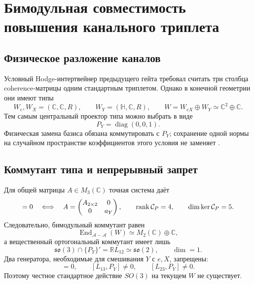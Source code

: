 \chapter{Бимодульная совместимость повышения канального триплета}
\label{ch:v8-baryon-c0-channel-triplet-bimodule-compatibility}

\section{Физическое разложение каналов}

Условный Hodge-интертвейнер предыдущего гейта требовал считать три столбца
coherence-матрицы одним стандартным триплетом. Однако в конечной геометрии
они имеют типы
\begin{equation}
 W_e,W_X=(\mathbb C,\mathbb C,R),
 \qquad
 W_Y=(\mathbb H,\mathbb C,R),
 \qquad
 W=W_{eX}\oplus W_Y\simeq\mathbb C^2\oplus\mathbb C.
 \label{eq:v8-channel-promotion-current-types}
\end{equation}
Тем самым центральный проектор типа можно выбрать в виде
\begin{equation}
 P_Y=\operatorname{diag}(0,0,1).
 \label{eq:v8-channel-promotion-type-projector}
\end{equation}
Физическая замена базиса обязана коммутировать с $P_Y$; сохранение одной
нормы на случайном пространстве коэффициентов этого условия не заменяет
\cite{v8-channel-promotion-krajewski,v8-channel-promotion-jureit}.

\section{Коммутант типа и непрерывный запрет}

Для общей матрицы $A\in M_3(\mathbb C)$ точная система даёт
\begin{equation}
 [A,P_Y]=0
 \quad\Longleftrightarrow\quad
 A=\begin{pmatrix}A_{2\times2}&0\\0&a_Y\end{pmatrix},
 \qquad
 \rank\mathcal C_P=4,
 \qquad
 \dim\ker\mathcal C_P=5.
 \label{eq:v8-channel-promotion-complex-commutant}
\end{equation}
Следовательно, бимодульный коммутант равен
\begin{equation}
 \operatorname{End}_{\mathcal A-\mathcal A}(W)
 \simeq M_2(\mathbb C)\oplus\mathbb C,
 \label{eq:v8-channel-promotion-commutant-algebra}
\end{equation}
а вещественный ортогональный коммутант имеет лишь
\begin{equation}
 \mathfrak{so}(3)\cap\{P_Y\}'
 =\mathbb R L_{12}\simeq\mathfrak{so}(2),
 \qquad
 \dim=1.
 \label{eq:v8-channel-promotion-orthogonal-commutant}
\end{equation}
Два генератора, необходимые для смешивания $Y$ с $e,X$, запрещены:
\begin{equation}
 [L_{12},P_Y]=0,
 \qquad
 [L_{13},P_Y]\ne0,
 \qquad
 [L_{23},P_Y]\ne0.
 \label{eq:v8-channel-promotion-so3-generator-test}
\end{equation}
Поэтому честное стандартное действие $SO(3)$ на текущем $W$ не существует.

